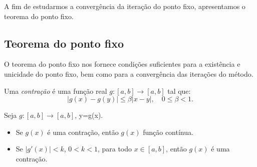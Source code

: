 A fim de estudarmos a convergência da iteração do ponto fixo, apresentamos o teorema do ponto fixo.

\subsection{Teorema do ponto fixo}

O teorema do ponto fixo nos fornece condições suficientes para a existência e unicidade do ponto fixo, bem como para a convergência das iterações do método.

\begin{defn}
 Uma \emph{contração} é uma função real $g:[a, b]\to [a, b]$ tal que:
 \begin{equation}
   |g(x)-g(y)|\leq \beta |x-y|,\quad 0\leq \beta < 1.
 \end{equation}
\end{defn}

\begin{obs}Seja $g:[a, b]\to [a, b]$, y=g(x).
  \begin{itemize}
  \item Se $g(x)$ é uma contração, então $g(x)$ função contínua.
  \item Se $|g'(x)| < k$, $0 < k < 1$, para todo $x\in [a, b]$, então $g(x)$ é uma contração.
  \end{itemize}
\end{obs}

